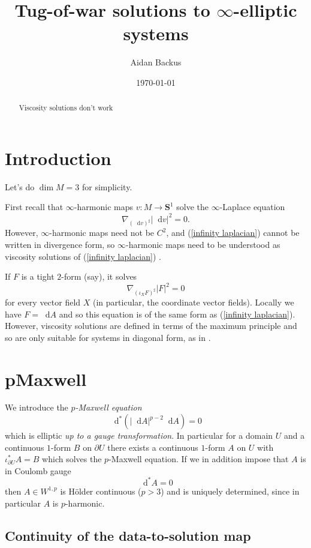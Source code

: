 \documentclass[reqno,11pt]{amsart}
\title{Tug-of-war solutions to $\infty$-elliptic systems}
\author{Aidan Backus}
\date{\today}
\newcommand{\Sph}{\mathbf S}
\newcommand*\dif{\mathop{}\!\mathrm{d}}
\newcommand{\dfn}[1]{\emph{#1}\index{#1}}
\theoremstyle{definition}
\numberwithin{equation}{section}
\begin{document}
\begin{abstract}
Viscosity solutions don't work
\end{abstract}

\maketitle

\section{Introduction}
Let's do $\dim M = 3$ for simplicity.

First recall that $\infty$-harmonic maps $v: M \to \Sph^1$ solve the $\infty$-Laplace equation 
\begin{equation}\label{infinity laplacian}
\nabla_{(\dif v)^\sharp} |\dif v|^2 = 0.
\end{equation}
However, $\infty$-harmonic maps need not be $C^2$, and (\ref{infinity laplacian}) cannot be written in divergence form, so $\infty$-harmonic maps need to be understood as viscosity solutions of (\ref{infinity laplacian}) \cite{Crandall2008}.

If $F$ is a tight $2$-form (say), it solves 
$$\nabla_{(\iota_X F)^\sharp} |F|^2 = 0$$
for every vector field $X$ (in particular, the coordinate vector fields).
Locally we have $F = \dif A$ and so this equation is of the same form as (\ref{infinity laplacian}).
However, viscosity solutions are defined in terms of the maximum principle and so are only suitable for systems in diagonal form, as in \cite{Ishii92}.

\section{pMaxwell}
We introduce the \dfn{$p$-Maxwell equation}
$$\dif^*(|\dif A|^{p - 2} \dif A) = 0$$
which is elliptic \emph{up to a gauge transformation}. 
In particular for a domain $U$ and a continuous $1$-form $B$ on $\partial U$ there exists a continuous $1$-form $A$ on $U$ with $\iota_{\partial U}^* A = B$ which solves the $p$-Maxwell equation.
If we in addition impose that $A$ is in Coulomb gauge 
$$\dif^* A = 0$$
then $A \in W^{1, p}$ is H\"older continuous ($p > 3$) and is uniquely determined, since in particular $A$ is $p$-harmonic.

\subsection{Continuity of the data-to-solution map}
\end{document}
